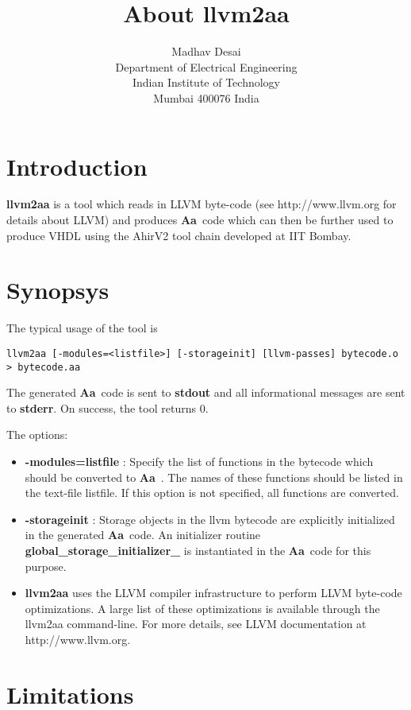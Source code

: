 \documentclass{article}
\title{About {\bf llvm2aa}}
\author{Madhav Desai \\ Department of Electrical Engineering \\ Indian Institute of Technology \\
	Mumbai 400076 India}
\newcommand{\Aa}{{\bf Aa}~}
\begin{document}
\maketitle

\section{Introduction}

{\bf llvm2aa}  is a tool which reads in LLVM byte-code (see http://www.llvm.org for
details about LLVM) and produces \Aa code which can then be further used
to produce VHDL using the AhirV2 tool chain developed at IIT Bombay.

\section{Synopsys}

The typical usage of the tool is 
\begin{verbatim}
llvm2aa [-modules=<listfile>] [-storageinit] [llvm-passes] bytecode.o > bytecode.aa
\end{verbatim}
The generated \Aa code is sent to {\bf stdout} and all informational
messages are sent to {\bf stderr}.  On success, the tool returns 0.

The options:
\begin{itemize}
\item {\bf -modules=listfile} : Specify the list of functions in the bytecode
which should be converted to \Aa.   The names of these functions should be
listed in the text-file listfile. If this option is not specified, all functions
are converted.
\item {\bf -storageinit} :  Storage objects in the llvm bytecode
are explicitly initialized in the generated \Aa code.   An initializer
routine {\bf global\_storage\_initializer\_} is instantiated in
the \Aa code for this purpose.
\item {\bf llvm2aa} uses the LLVM compiler
infrastructure to perform LLVM byte-code optimizations.  A large list
of these optimizations is available through the llvm2aa command-line.
For more details, see LLVM documentation at http://www.llvm.org.
\end{itemize}

\section{Limitations}
\end{document}
